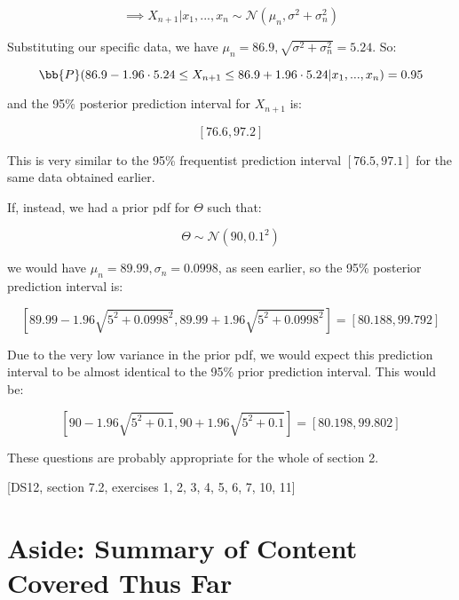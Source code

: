 \documentclass[a4paper]{article}
\begin{document}
                $$
                    \implies X_{n+1} | x_1, ..., x_n \sim \mathcal{N}(\mu_n,
                    \sigma^2 + \sigma_n^2)
                $$

                Substituting our specific data, we have $\mu_n = 86.9, \sqrt{
                \sigma^2 + \sigma_n^2} = 5.24$. So:

                $$
                    \bb{P}(86.9 - 1.96 \cdot 5.24 \leq X_{n+1} \leq 86.9 + 1.96
                    \cdot 5.24 | x_1, ..., x_n) = 0.95
                $$

                and the 95\% posterior prediction interval for $X_{n+1}$ is:

                $$
                    [76.6, 97.2]
                $$

                This is very similar to the 95\% frequentist prediction interval
                $[76.5, 97.1]$ for the same data obtained earlier.

                If, instead, we had a prior pdf for $\Theta$ such that:

                $$
                    \Theta \sim \mathcal{N}(90, 0.1^2)
                $$

                we would have $\mu_n = 89.99, \sigma_n = 0.0998$, as seen
                earlier, so the 95\% posterior prediction interval is:

                $$
                    [89.99 - 1.96\sqrt{5^2 + 0.0998^2}, 89.99 + 1.96\sqrt{5^2 +
                    0.0998^2}] = [80.188, 99.792]
                $$

                Due to the very low variance in the prior pdf, we would expect
                this prediction interval to be almost identical to the 95\%
                prior prediction interval. This would be:

                $$
                    [90 - 1.96 \sqrt{5^2 + 0.1}, 90 + 1.96\sqrt{5^2 + 0.1}] =
                    [80.198, 99.802]
                $$

                \begin{relq}
                    These questions are probably appropriate for the whole of
                    section 2.

                    [DS12, section 7.2, exercises 1, 2, 3, 4, 5, 6, 7, 10, 11]
                \end{relq}

    \newpage
    \section*{Aside: Summary of Content Covered Thus Far}
\end{document}
